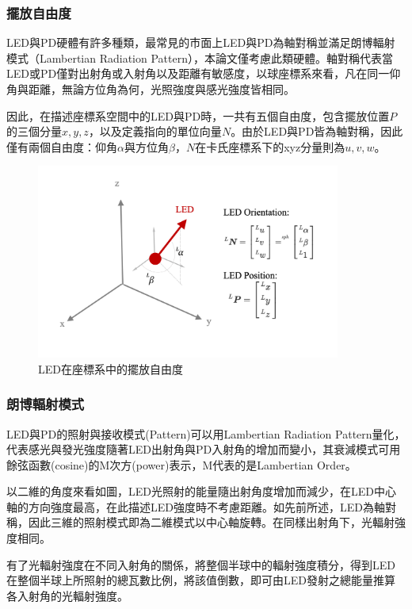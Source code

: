         \subsubsection{擺放自由度}
        LED與PD硬體有許多種類，最常見的市面上LED與PD為軸對稱並滿足朗博輻射模式（Lambertian Radiation Pattern），本論文僅考慮此類硬體。軸對稱代表當LED或PD僅對出射角或入射角以及距離有敏感度，以球座標系來看，凡在同一仰角與距離，無論方位角為何，光照強度與感光強度皆相同。

        因此，在描述座標系空間中的LED與PD時，一共有五個自由度，包含擺放位置$P$的三個分量$x,y,z$，以及定義指向的單位向量$N$。由於LED與PD皆為軸對稱，因此僅有兩個自由度：仰角$\alpha$與方位角$\beta$，$N$在卡氏座標系下的xyz分量則為$u,v,w$。


        \begin{figure}[ht]
            \centering
            \includegraphics[width=10cm]{ch2pic/LED_config.png}
            \caption{LED在座標系中的擺放自由度}
            \label{pic:led_config}
        \end{figure}

        \subsubsection{朗博輻射模式}

        LED與PD的照射與接收模式(Pattern)可以用Lambertian Radiation Pattern量化，代表感光與發光強度隨著LED出射角與PD入射角的增加而變小，其衰減模式可用餘弦函數(cosine)的M次方(power)表示，M代表的是Lambertian Order。

        以二維的角度來看如圖，LED光照射的能量隨出射角度增加而減少，在LED中心軸的方向強度最高，在此描述LED強度時不考慮距離。如先前所述，LED為軸對稱，因此三維的照射模式即為二維模式以中心軸旋轉。在同樣出射角下，光輻射強度相同。
        
        有了光輻射強度在不同入射角的關係，將整個半球中的輻射強度積分，得到LED在整個半球上所照射的總瓦數比例，將該值倒數，即可由LED發射之總能量推算各入射角的光輻射強度。

